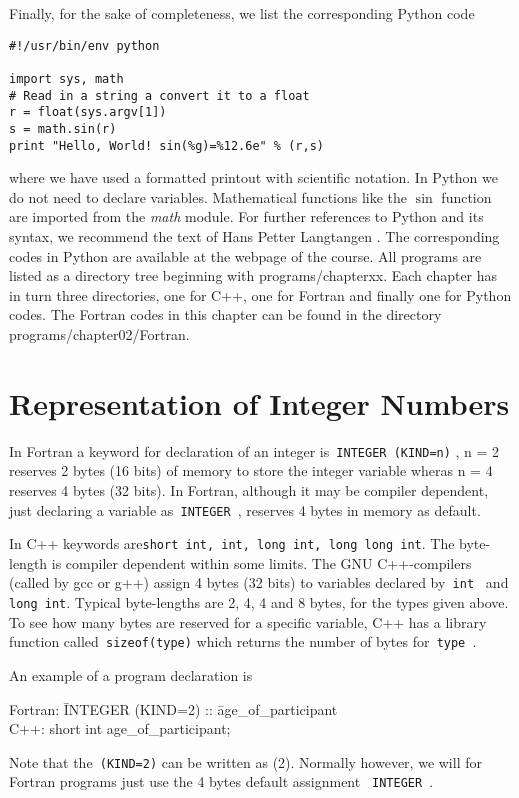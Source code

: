 Finally, for the sake of completeness, we list the corresponding Python code
\lstset{language=python}
\begin{lstlisting}[title={\url{http://folk.uio.no/mhjensen/compphys/programs/chapter02/python/program1.py}}]
#!/usr/bin/env python

import sys, math
# Read in a string a convert it to a float
r = float(sys.argv[1]) 
s = math.sin(r)
print "Hello, World! sin(%g)=%12.6e" % (r,s)
\end{lstlisting}
where we have used a formatted printout with scientific notation. 
In Python we do not need to declare variables. Mathematical functions like the $\sin$ 
function are imported from the {\em math} module.  For further references to Python
and its syntax, we recommend the text of Hans Petter Langtangen \cite{langtangen2009}.
The corresponding codes in Python are available at the webpage of the course.
All programs are listed as a directory tree beginning with programs/chapterxx.  Each chapter has in turn
three directories, one for C++, one for Fortran and finally one for Python codes.
The Fortran codes in this chapter can be found in the directory programs/chapter02/Fortran.
\section{Representation of Integer Numbers}

In Fortran a 
keyword for declaration of an integer is\verb? INTEGER (KIND=n)? ,
n = 2 reserves 2 bytes (16 bits) of memory to store the integer variable
wheras n = 4 reserves 4 bytes (32 bits).  In Fortran, although it may be
compiler dependent, just declaring a variable as\verb? INTEGER ?, reserves
4 bytes in memory as default. 

In C++ keywords are\verb?short int, int, long int, long long int?. The byte-length
is compiler dependent within some limits. The GNU C++-compilers (called by gcc or g++)
assign
4 bytes (32 bits) to variables declared by\verb? int ? and\verb? long int?. 
Typical byte-lengths
 are 2, 4, 4 and 8 bytes, for the types given above.
To see how many bytes are reserved for a specific variable, C++ has a
library function called\verb? sizeof(type)? which returns the number of
bytes for\verb? type ?. 

An example of a program declaration is
%
\begin{tabbing}
%
Fortran: \hspace*{1cm}\=INTEGER (KIND=2) :: \=age\_of\_participant\\
C++:                    \>short int           \>age\_of\_participant;
\end{tabbing}
%
Note that the\verb? (KIND=2)? can be written as (2). Normally however, we will 
for Fortran programs just use the 4 bytes default assignment 
\verb? INTEGER ?.

